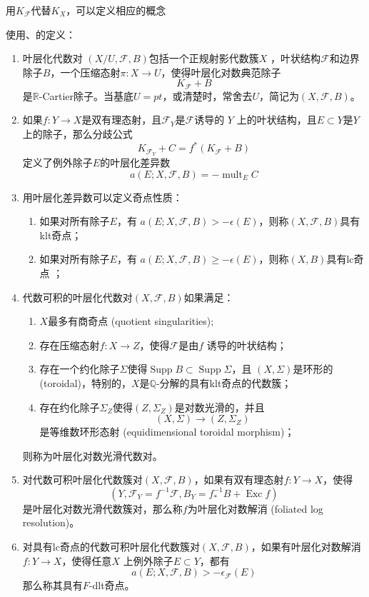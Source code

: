 用$K_{\mathcal{F}}$代替$K_{X}$，可以定义相应的概念
\begin{definition}
使用\cite[3.4.5,6.2.1]{chlx}、\cite[3.2]{acss}的定义：
  \begin{enumerate}
    \item 叶层化代数对 $(X/U,\mathcal{F},B)$包括一个正规射影代数簇$X$ ，叶状结构$\mathcal{F}$和边界除子$B$，一个压缩态射$\pi:X\to U$，使得叶层化对数典范除子
  \[ K_{\mathcal{F}}+B \]
  是$\mathbb{R}$-Cartier除子。当基底$U=pt$，或清楚时，常舍去$U$，简记为$(X,\mathcal{F},B)$。 
    \item 如果$f:Y\to X$是双有理态射，且$\mathcal{F}_{Y} $是$\mathcal{F} $诱导的 $Y$ 上的叶状结构，且$E \subset Y$是$Y$ 上的除子，那么分歧公式
  \[ K_{\mathcal{F}_{Y}}+C=f^{*}(K_{\mathcal{F}}+B) \]
  定义了例外除子$E$的叶层化差异数
  \[ a(E;X,\mathcal{F},B)=- \operatorname{mult}_{E}C \]
    \item 用叶层化差异数可以定义奇点性质：
      \begin{enumerate}
        \item 如果对所有除子$E$，有 $a(E;X,\mathcal{F},B)>-\epsilon(E)$，则称$(X,\mathcal{F},B) $具有klt奇点；
        \item 如果对所有除子$E$，有 $a(E;X,\mathcal{F},B)\geqslant -\epsilon(E)$，则称$(X,B) $具有lc奇点 ；
      \end{enumerate}
    \item 代数可积的叶层化代数对$(X,\mathcal{F},B)$如果满足：
      \begin{enumerate}
        \item $X$最多有商奇点 (quotient singularities);
        \item 存在压缩态射$f:X\to Z$，使得$\mathcal{F}$是由$f$ 诱导的叶状结构； 
        \item 存在一个约化除子$\Sigma$使得$\operatorname{Supp}B \subset \operatorname{Supp} \Sigma $，且 $(X,\Sigma)$是环形的 (toroidal)，特别的，$X$是$\mathbb{Q}$-分解的具有klt奇点的代数簇；
        \item 存在约化除子$\Sigma_{Z}$使得$ (Z,\Sigma_{Z})$是对数光滑的，并且
          \[ (X,\Sigma)\to (Z,\Sigma_{Z}) \]
          是等维数环形态射 (equidimensional toroidal morphism)；
      \end{enumerate}
      则称为叶层化对数光滑代数对。
    \item 对代数可积叶层化代数簇对$(X,\mathcal{F},B)$，如果有双有理态射$f:Y\to X$，使得
      \[ (Y,\mathcal{F}_{Y}=f^{-1}\mathcal{F},B_{Y}=f^{-1}_{*}B+ \operatorname{Exc}f) \]
      是叶层化对数光滑代数簇对，那么称$f$为叶层化对数解消 (foliated log resolution)。
    \item 对具有lc奇点的代数可积叶层化代数簇对$(X,\mathcal{F},B)$，如果有叶层化对数解消$f:Y\to X$，使得任意$X$ 上例外除子$E \subset Y$，都有
      \[ a(E;X,\mathcal{F},B)>-\epsilon_{\mathcal{F}}(E) \]
      那么称其具有$F$-dlt奇点。
  \end{enumerate}
\end{definition}
